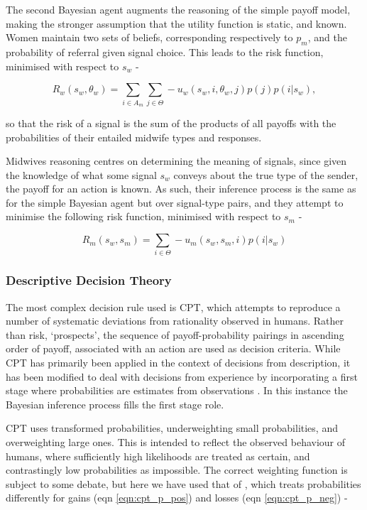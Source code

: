 \documentclass[graybox]{svmult}
\begin{document}
The second Bayesian agent augments the reasoning of the simple payoff model, making the stronger assumption that the utility function is static, and known. Women maintain two sets of beliefs, corresponding respectively to \(p_{m}\), and the probability of referral given signal choice. This leads to the risk function, minimised with respect to \(s_{w}\) -

\begin{equation}
R_{w}(s_{w}, \theta_{w}) = \sum_{i\in A_{m}}\sum_{j\in \Theta} -u_{w}(s_{w}, i, \theta_{w}, j)p(j)p(i | s_{w}),
\end{equation}

so that the risk of a signal is the sum of the products of all payoffs with the probabilities of their entailed midwife types and responses.

Midwives reasoning centres on determining the meaning of signals, since given the knowledge of what some signal \(s_{w}\) conveys about the true type of the sender, the payoff for an action is known. As such, their inference process is the same as for the simple Bayesian agent but over signal-type pairs, and they attempt to minimise the following risk function, minimised with respect to \(s_{m}\) -

\begin{equation}
R_{m}(s_{w}, s_{m}) = \sum_{i\in \Theta} -u_{m}(s_{w}, s_{m}, i)p(i | s_{w})
\end{equation}

\subsubsection{Descriptive Decision Theory}

The most complex decision rule used is \ac{CPT}, which attempts to reproduce a number of systematic deviations from rationality observed in humans. Rather than risk, `prospects', the sequence of payoff-probability pairings in ascending order of payoff, associated with an action  are used as decision criteria. While \ac{CPT} has primarily been applied in the context of decisions from description, it has been modified to deal with decisions from experience by incorporating a first stage where probabilities are estimates from observations \cite{FoxCPT}. In this instance the Bayesian inference process fills the first stage role.

\ac{CPT} uses transformed probabilities, underweighting small probabilities, and overweighting large ones. This is intended to reflect the observed behaviour of humans, where sufficiently high likelihoods are treated as certain, and contrastingly low probabilities as impossible. The correct weighting function is subject to some debate, but here we have used that of \citet{Tversky1992}, which treats probabilities differently for gains (eqn \ref{eqn:cpt_p_pos}) and losses (eqn \ref{eqn:cpt_p_neg}) -
\end{document}
